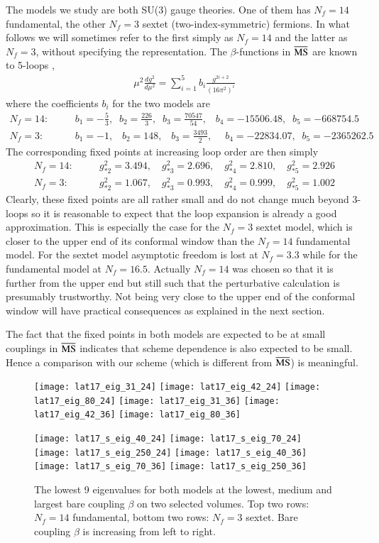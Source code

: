 \documentclass[epj]{webofc}
\def\msbar{\overline{\rm MS\kern-0.5pt}\kern0.5pt}
\def\bea{\begin{eqnarray}}
\def\eea{\end{eqnarray}}
\def\nn{\nonumber}
\begin{document}
The models we study are both SU(3) gauge theories. One of them has $N_f = 14$ fundamental, the other
$N_f = 3$ sextet (two-index-symmetric) fermions. In what follows we will 
sometimes refer to the first simply as $N_f = 14$ and the latter as
$N_f = 3$, without specifying the representation. The $\beta$-functions in $\msbar$ are known to 5-loops
\cite{Baikov:2016tgj, Herzog:2017ohr},
\bea
\mu^2 \frac{dg^2}{d\mu^2}  = \sum_{i=1}^5 b_i \frac{g^{2i+2}}{(16\pi^2)^i} 
\eea
where the coefficients $b_i$ for the two models are
\bea
N_f = 14:&&\quad b_1 = -\frac{5}{3},\;\; b_2 = \frac{226}{3},\;\;  b_3 = \frac{70547}{54},\;\;\; b_4 = -15506.48,\;\;
b_5 = -668754.5 \nn \\
N_f = 3:&&\quad b_1 = -1,\;\;\; b_2 = 148,\;\;\; b_3 = \frac{3493}{2},\;\;\;\;\, b_4 = -22834.07,\;\; b_5 = -2365262.5  \nn
\eea
The corresponding fixed points at increasing loop order are then simply
\bea
N_f = 14:&&\quad g_{*2}^2 = 3.494,\quad g_{*3}^2 = 2.696,\quad g_{*4}^2 = 2.810,\quad g_{*5}^2 = 2.926 \nn \\
N_f = 3:&& \quad g_{*2}^2 = 1.067,\quad g_{*3}^2 = 0.993,\quad g_{*4}^2 = 0.999,\quad g_{*5}^2 = 1.002 
\eea
Clearly, these fixed points are all rather small and do not change much beyond 3-loops so it is reasonable to expect
that the loop expansion is already a good approximation. This is especially the case for the $N_f=3$ sextet model, which is closer
to the upper end of its conformal window than the $N_f=14$ fundamental model. For the sextet model asymptotic freedom is lost
at $N_f = 3.3$ while for the fundamental model at $N_f = 16.5$. Actually $N_f = 14$ was chosen so that it is further from the
upper end but still such that the perturbative calculation is presumably trustworthy. Not being very close to the upper
end of the conformal window will have practical consequences as explained in the next section. 

The fact that the fixed points in both models are expected to be at small couplings in $\msbar$ indicates that
scheme dependence is also expected to be small. Hence a comparison with our scheme (which is different from $\msbar$)
is meaningful.


\begin{figure}
\centering
\texttt{[image: lat17\_eig\_31\_24]} \texttt{[image: lat17\_eig\_42\_24]} \texttt{[image: lat17\_eig\_80\_24]}
\texttt{[image: lat17\_eig\_31\_36]} \texttt{[image: lat17\_eig\_42\_36]} \texttt{[image: lat17\_eig\_80\_36]}

\texttt{[image: lat17\_s\_eig\_40\_24]} \texttt{[image: lat17\_s\_eig\_70\_24]} \texttt{[image: lat17\_s\_eig\_250\_24]}
\texttt{[image: lat17\_s\_eig\_40\_36]} \texttt{[image: lat17\_s\_eig\_70\_36]} \texttt{[image: lat17\_s\_eig\_250\_36]}
\caption{The lowest 9 eigenvalues for both models at the lowest, medium and largest bare coupling $\beta$ on two selected
volumes. Top two rows: $N_f = 14$ fundamental, bottom two rows: $N_f = 3$ sextet. Bare coupling $\beta$ is increasing from left
to right.}
\label{quartets}
\end{figure}
\end{document}
